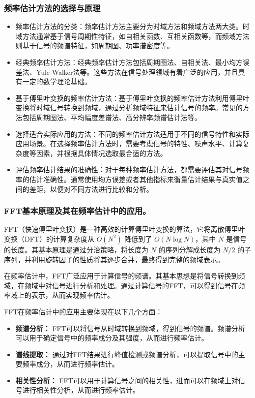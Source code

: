 \documentclass[a4paper,12pt]{article}
\begin{document}
\subsubsection{频率估计方法的选择与原理}
\begin{itemize}
    \item 频率估计方法的分类：频率估计方法主要分为时域方法和频域方法两大类。时域方法通常基于信号周期性特征，如自相关函数、互相关函数等，而频域方法则基于信号的频谱特征，如周期图、功率谱密度等。
    \item 经典频率估计方法：经典频率估计方法包括周期图法、自相关法、最小均方误差法、Yule-Walker法等。这些方法在信号处理领域有着广泛的应用，并且具有一定的数学理论基础。
    \item 基于傅里叶变换的频率估计方法：基于傅里叶变换的频率估计方法利用傅里叶变换将时域信号转换到频域，通过分析频域特征来估计信号的频率。常见的方法包括周期图法、平均幅度差谱法、高分辨率频谱估计法等。
    \item 选择适合实际应用的方法：不同的频率估计方法适用于不同的信号特性和实际应用场景。在选择频率估计方法时，需要考虑信号的特性、噪声水平、计算复杂度等因素，并根据具体情况选取最合适的方法。
    \item 评估频率估计结果的准确性：对于每种频率估计方法，都需要评估其对信号频率的估计准确性。通常使用均方误差或者其他指标来衡量估计结果与真实值之间的差距，以便对不同方法进行比较和分析。
\end{itemize}

\subsubsection{FFT基本原理及其在频率估计中的应用。}
FFT（快速傅里叶变换）是一种高效的计算傅里叶变换的算法，它将离散傅里叶变换（DFT）的计算复杂度从 \(O(N^2)\) 降低到了 \(O(N \log N)\)，其中 \(N\) 是信号的长度。其基本原理是通过分治策略，将长度为 \(N\) 的序列分解成长度为 \(N/2\) 的子序列，并利用旋转因子的性质将其逐步合并，最终得到完整的频域表示。

在频率估计中，FFT广泛应用于计算信号的频谱。其基本思想是将信号转换到频域，在频域中对信号进行分析和处理。通过计算信号的FFT，可以得到信号在频率域上的表示，从而实现频率估计。

FFT在频率估计中的应用主要体现在以下几个方面：
\begin{itemize}
    \item \textbf{频谱分析：} FFT可以将信号从时域转换到频域，得到信号的频谱。频谱分析可以用于确定信号中的频率成分及其强度，从而进行频率估计。
    \item \textbf{谱线提取：} 通过对FFT结果进行峰值检测或频谱分析，可以提取信号中的主要频率成分，从而进行频率估计。
    \item \textbf{相关性分析：} FFT可以用于计算信号之间的相关性，进而可以在频域上对信号进行相关性分析，从而进行频率估计。
\end{itemize}
\end{document}
